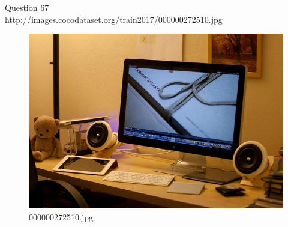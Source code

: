 Question 67\\
http://images.cocodataset.org/train2017/000000272510.jpg
\begin{figure}[h]
    \centering
    \includegraphics[width=0.8\linewidth]{../image set/hard/000000272510.jpg}
    \caption{000000272510.jpg}
\end{figure}
